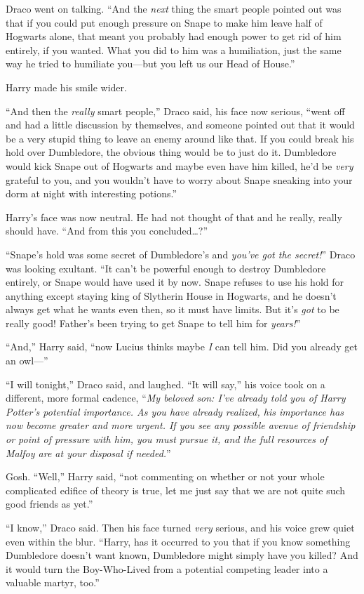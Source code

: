 Draco went on talking. “And the \emph{next} thing the smart people pointed out was that if you could put enough pressure on Snape to make him leave half of Hogwarts alone, that meant you probably had enough power to get rid of him entirely, if you wanted. What you did to him was a humiliation, just the same way he tried to humiliate you—but you left us our Head of House.”

Harry made his smile wider.

“And then the \emph{really} smart people,” Draco said, his face now serious, “went off and had a little discussion by themselves, and someone pointed out that it would be a very stupid thing to leave an enemy around like that. If you could break his hold over Dumbledore, the obvious thing would be to just do it. Dumbledore would kick Snape out of Hogwarts and maybe even have him killed, he’d be \emph{very} grateful to you, and you wouldn’t have to worry about Snape sneaking into your dorm at night with interesting potions.”

Harry’s face was now neutral. He had not thought of that and he really, really should have. “And from this you concluded…?”

“Snape’s hold was some secret of Dumbledore’s and \emph{you’ve got the secret!}” Draco was looking exultant. “It can’t be powerful enough to destroy Dumbledore entirely, or Snape would have used it by now. Snape refuses to use his hold for anything except staying king of Slytherin House in Hogwarts, and he doesn’t always get what he wants even then, so it must have limits. But it’s \emph{got} to be really good! Father’s been trying to get Snape to tell him for \emph{years!}”

“And,” Harry said, “now Lucius thinks maybe \emph{I} can tell him. Did you already get an owl—”

“I will tonight,” Draco said, and laughed. “It will say,” his voice took on a different, more formal cadence, “\emph{My beloved son: I’ve already told you of Harry Potter’s potential importance. As you have already realized, his importance has now become greater and more urgent. If you see any possible avenue of friendship or point of pressure with him, you must pursue it, and the full resources of Malfoy are at your disposal if needed.}”

Gosh. “Well,” Harry said, “not commenting on whether or not your whole complicated edifice of theory is true, let me just say that we are not quite such good friends as yet.”

“I know,” Draco said. Then his face turned \emph{very} serious, and his voice grew quiet even within the blur. “Harry, has it occurred to you that if you know something Dumbledore doesn’t want known, Dumbledore might simply have you killed? And it would turn the Boy-Who-Lived from a potential competing leader into a valuable martyr, too.”

